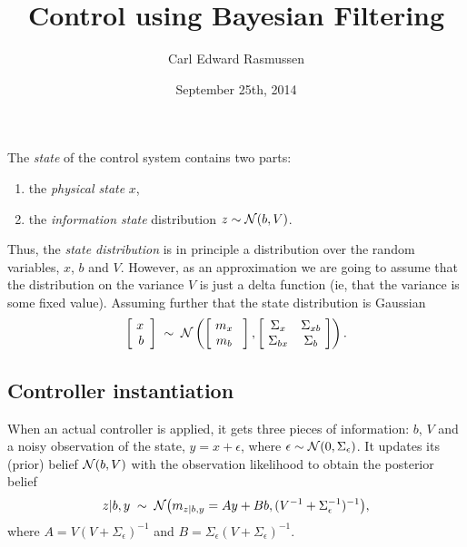 \documentclass{article}
\title{Control using Bayesian Filtering}
\author{Carl Edward Rasmussen}
\date{September 25th, 2014}
\begin{document}
\maketitle

The \emph{state} of the control system contains two parts:
\begin{enumerate}
\item the \emph{physical state} $x$,
\item the \emph{information state} distribution $z\sim{\cal N}(b,V)$.
\end{enumerate}

Thus, the \emph{state distribution} is in principle a distribution over the random
variables, $x$, $b$ and $V$. However, as an approximation we are going
to assume that the distribution on the variance $V$ is just a delta
function (ie, that the variance is some fixed value). Assuming further
that the state distribution is Gaussian
\begin{equation}
\left[\!\begin{array}{c}x\\b\!\end{array}\right]\;\sim\;{\cal
  N}\left(\left[\!\begin{array}{c}m_x\\ m_b\end{array}\;\right],
\left[\!\begin{array}{cc}\Sigma_x&\Sigma_{xb}\\
\Sigma_{bx}&\Sigma_b\end{array}\!\right]\right).
\end{equation}

\subsection*{Controller instantiation}

When an actual controller is applied, it gets three pieces of
information: $b$, $V$ and a noisy observation of the state, $y = x +
\epsilon$, where $\epsilon\sim{\cal N}(0,\Sigma_\epsilon)$. It updates
its (prior) belief ${\cal N}(b, V)$ with the observation likelihood to
obtain the posterior belief
\begin{equation}
z|b,y\;\sim\;{\cal N}\big(m_{z|b,y}=Ay+Bb,(V^{-1}+\Sigma_\epsilon^{-1})^{-1}\big),
\end{equation}
where $A=V(V+\Sigma_\epsilon)^{-1}$ and
$B=\Sigma_\epsilon(V+\Sigma_\epsilon)^{-1}$.
\end{document}
